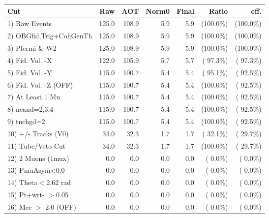  \begin{table}[h!]\centering
 \begin{tabular}{||l||r|r|r|r|r|r||}
 \hline
 \hline
 Cut & Raw & AOT & Norm0 & Final & Ratio & eff.       \\
 \hline
  1) Raw Events           &        125.0 &        108.9 &          5.9 &          5.9 & (100.0\%) & (100.0\%) \\
  2) OBGfid,Trig+CohGenTh &        125.0 &        108.9 &          5.9 &          5.9 & (100.0\%) & (100.0\%) \\
  3) Pfermi \& W2         &        125.0 &        108.9 &          5.9 &          5.9 & (100.0\%) & (100.0\%) \\
  4) Fid. Vol. -X         &        122.0 &        105.9 &          5.7 &          5.7 & ( 97.3\%) & ( 97.3\%) \\
  5) Fid. Vol. -Y         &        115.0 &        100.7 &          5.4 &          5.4 & ( 95.1\%) & ( 92.5\%) \\
  6) Fid. Vol. -Z (OFF)   &        115.0 &        100.7 &          5.4 &          5.4 & (100.0\%) & ( 92.5\%) \\
  7) At Least 1 Mu        &        115.0 &        100.7 &          5.4 &          5.4 & (100.0\%) & ( 92.5\%) \\
  8) ncand=2,3,4          &        115.0 &        100.7 &          5.4 &          5.4 & (100.0\%) & ( 92.5\%) \\
  9) tnchgd=2             &        115.0 &        100.7 &          5.4 &          5.4 & (100.0\%) & ( 92.5\%) \\
 10) +/- Tracks (V0)      &         34.0 &         32.3 &          1.7 &          1.7 & ( 32.1\%) & ( 29.7\%) \\
 11) Tube/Veto Cut        &         34.0 &         32.3 &          1.7 &          1.7 & (100.0\%) & ( 29.7\%) \\
 12) 2 Muons (1mux)       &          0.0 &          0.0 &          0.0 &          0.0 & (  0.0\%) & (  0.0\%) \\
 13) PmuAsym<0.0          &          0.0 &          0.0 &          0.0 &          0.0 & (  0.0\%) & (  0.0\%) \\
 14) Theta$<$2.62 rad     &          0.0 &          0.0 &          0.0 &          0.0 & (  0.0\%) & (  0.0\%) \\
 15) Pt+wrt- $>$0.05      &          0.0 &          0.0 &          0.0 &          0.0 & (  0.0\%) & (  0.0\%) \\
 16) Mee $>$ 2.0  (OFF)   &          0.0 &          0.0 &          0.0 &          0.0 & (  0.0\%) & (  0.0\%) \\

\end{tabular}
\end{table}
